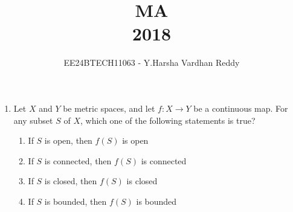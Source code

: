 \documentclass[journal,,12pt,onecolumn]{IEEEtran}
\theoremstyle{remark}
\begin{document}

\vspace{3cm}

\title{MA\\2018}
\author{EE24BTECH11063 - Y.Harsha Vardhan Reddy}
\maketitle

\bigskip

\renewcommand{\thefigure}{\theenumi}
\renewcommand{\thetable}{\theenumi}

\begin{enumerate}
\section*{Q.1 to Q.5 carry 1 mark each}
\item Let $ X $ and $ Y $ be metric spaces, and let $ f : X \to Y $ be a continuous map. For any subset $ S $ of $ X $, which one of the following statements is true? 
\begin{enumerate}
    \item If $ S $ is open, then $ f(S) $ is open
    \item If $ S $ is connected, then $ f(S) $ is connected
    \item If $ S $ is closed, then $ f(S) $ is closed
    \item If $ S $ is bounded, then $ f(S) $ is bounded
\end{enumerate}

\bigskip


\end{enumerate}
\end{document}
